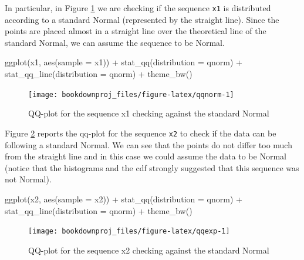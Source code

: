 \documentclass[
]{book}
\newenvironment{Shaded}{\begin{snugshade}}{\end{snugshade}}
\newcommand{\AttributeTok}[1]{\textcolor[rgb]{0.77,0.63,0.00}{#1}}
\newcommand{\FunctionTok}[1]{\textcolor[rgb]{0.00,0.00,0.00}{#1}}
\newcommand{\NormalTok}[1]{#1}
\newcommand{\SpecialCharTok}[1]{\textcolor[rgb]{0.00,0.00,0.00}{#1}}
\theoremstyle{definition}
\theoremstyle{definition}
\theoremstyle{definition}
\theoremstyle{definition}
\theoremstyle{remark}
\begin{document}
In particular, in Figure \ref{fig:qqnorm} we are checking if the sequence \texttt{x1} is distributed according to a standard Normal (represented by the straight line). Since the points are placed almost in a straight line over the theoretical line of the standard Normal, we can assume the sequence to be Normal.

\begin{Shaded}
\begin{Highlighting}[]
\FunctionTok{ggplot}\NormalTok{(x1, }\FunctionTok{aes}\NormalTok{(}\AttributeTok{sample =}\NormalTok{ x1)) }\SpecialCharTok{+}
   \FunctionTok{stat\_qq}\NormalTok{(}\AttributeTok{distribution =}\NormalTok{ qnorm) }\SpecialCharTok{+}
   \FunctionTok{stat\_qq\_line}\NormalTok{(}\AttributeTok{distribution =}\NormalTok{ qnorm) }\SpecialCharTok{+}
   \FunctionTok{theme\_bw}\NormalTok{()}
\end{Highlighting}
\end{Shaded}

\begin{figure}

{\centering \texttt{[image: bookdownproj\_files/figure-latex/qqnorm-1]} 

}

\caption{QQ-plot for the sequence x1 checking against the standard Normal}\label{fig:qqnorm}
\end{figure}

Figure \ref{fig:qqexp} reports the qq-plot for the sequence \texttt{x2} to check if the data can be following a standard Normal. We can see that the points do not differ too much from the straight line and in this case we could assume the data to be Normal (notice that the histograms and the cdf strongly suggested that this sequence was not Normal).

\begin{Shaded}
\begin{Highlighting}[]
\FunctionTok{ggplot}\NormalTok{(x2, }\FunctionTok{aes}\NormalTok{(}\AttributeTok{sample =}\NormalTok{ x2)) }\SpecialCharTok{+}
   \FunctionTok{stat\_qq}\NormalTok{(}\AttributeTok{distribution =}\NormalTok{ qnorm) }\SpecialCharTok{+}
   \FunctionTok{stat\_qq\_line}\NormalTok{(}\AttributeTok{distribution =}\NormalTok{ qnorm) }\SpecialCharTok{+}
   \FunctionTok{theme\_bw}\NormalTok{()}
\end{Highlighting}
\end{Shaded}

\begin{figure}

{\centering \texttt{[image: bookdownproj\_files/figure-latex/qqexp-1]} 

}

\caption{QQ-plot for the sequence x2 checking against the standard Normal}\label{fig:qqexp}
\end{figure}
\end{document}
